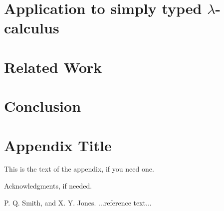 \documentclass[preprint,9pt,authoryear]{sigplanconf}
\begin{document}
\section{Application to simply typed $\lambda$-calculus}

\section{Related Work}

\section{Conclusion}

\appendix
\section{Appendix Title}

This is the text of the appendix, if you need one.

\acks

Acknowledgments, if needed.





\begin{thebibliography}{}
\softraggedright

P. Q. Smith, and X. Y. Jones. ...reference text...

\end{thebibliography}
\end{document}
